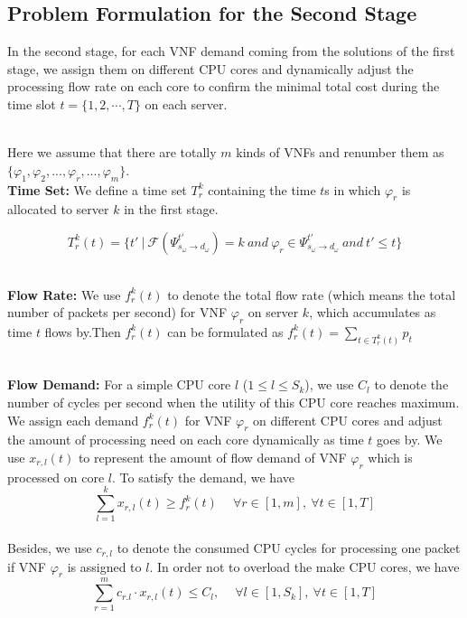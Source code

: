 \documentclass{acmtog}
\begin{document}
\subsection{Problem Formulation for the Second Stage}
In the second stage, for each VNF demand coming from the solutions of the first stage, we assign them on different CPU cores and dynamically adjust the processing flow rate on each core to confirm the minimal total cost during the time slot $t=\{1,2,\cdots,T\}$ on each server.

\\\indent Here we assume that there are totally $m$ kinds of VNFs and renumber them as $\{\varphi_1,\varphi_2,...,\varphi_r,...,\varphi_m\}$. 
\\\noindent\textbf{Time Set: }We define a time set $T_r^k$ containing the time $t$s in which $\varphi_r$ is allocated to server $k$ in the first stage.

\begin{equation}
  T_r^k(t)=\{t'~|~\mathcal{F}(\Psi_{s_\omega\rightarrow d_\omega}^{t'})=k~and~\varphi_r \in \Psi_{s_\omega\rightarrow d_\omega}^{t'}~and~t'\leq t\}
\end{equation}


\\\noindent\textbf{Flow Rate: }We use $f_r^k(t)$ to denote the total flow rate (which means the total number of packets per second) for VNF $\varphi_r$ on server $k$, which accumulates as time $t$ flows by.Then $f_r^k(t)$ can be formulated as
$f_r^k(t)=\sum_{t \in T_r^k(t)}p_t$


\\\noindent\textbf{Flow Demand: }For a simple CPU core $l$ ($1\leq l\leq S_k$), we use $C_l$ to denote the number of cycles per second when the utility of this CPU core reaches maximum. We assign each demand $f_r^k(t)$ for VNF $\varphi_r$ on different CPU cores and adjust the amount of processing need on each core dynamically as time $t$ goes by. We use $x_{r,l}(t)$ to represent the amount of flow demand of VNF $\varphi_r$ which is processed on core $l$. To satisfy the demand, we have
\begin{equation}
  \sum_{l=1}^k x_{r,l}(t) \geq f_r^k(t) ~\quad \forall r \in [1,m],~\forall t \in [1,T]
\end{equation}
\\\indent Besides, we use $c_{r,l}$ to denote the consumed CPU cycles for processing one packet if VNF $\varphi_r$ is assigned to $l$. In order not to overload the make CPU cores, we have
\begin{equation}\label{CoreConstraint}
  \sum_{r=1}^m c_{r.l}\cdot x_{r,l}(t) \leq C_l,~\quad \forall l \in [1,S_k], ~\forall t \in [1,T]
\end{equation}
\end{document}
